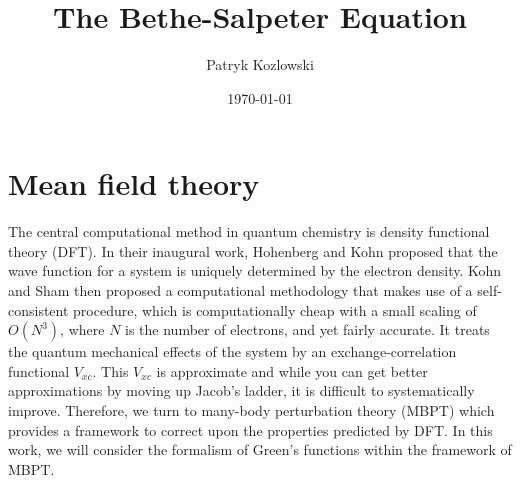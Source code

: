 \documentclass[12pt]{article}
\title{The Bethe-Salpeter Equation}
\author{Patryk Kozlowski}
\date{\today}
\begin{document}
\maketitle
\section{Mean field theory}
The central computational method in quantum chemistry is density functional theory (DFT). In their inaugural work, Hohenberg and Kohn proposed that the wave function for a system is uniquely determined by the electron density. Kohn and Sham then proposed a computational methodology that makes use of a self-consistent procedure, which is computationally cheap with a small scaling of $O(N^3)$, where $N$ is the number of electrons, and yet fairly accurate\autocite{bowler_calculations_2010}. It treats the quantum mechanical effects of the system by an exchange-correlation functional $V_{xc}$. This $V_{xc}$ is approximate and while you can get better approximations by moving up Jacob's ladder\autocite{milman_jacobs_2021}, it is difficult to systematically improve. Therefore, we turn to many-body perturbation theory (MBPT) which provides a framework to correct upon the properties predicted by DFT. In this work, we will consider the formalism of Green's functions within the framework of MBPT.
\end{document}
